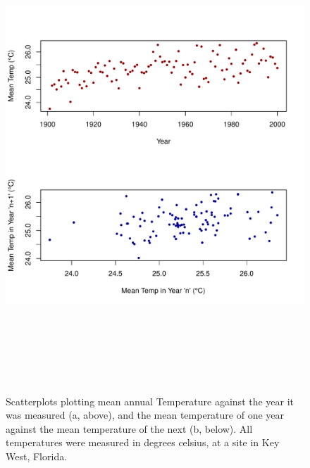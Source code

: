 \documentclass[12pt]{article}
\begin{document}
\begin{figure}[tp!]
\centering
\includegraphics[width = 6in, height = 7in]{../data/ACC_Data.pdf}
\caption{Scatterplots plotting mean annual Temperature against the year it 
was measured (a, above), and the mean temperature of one year against 
the mean temperature of the next (b, below). All temperatures were measured in
degrees celsius, at a site in Key West, Florida.}
\label{fig:Figure 1a&b}
\end{figure}

\newpage
\end{document}
